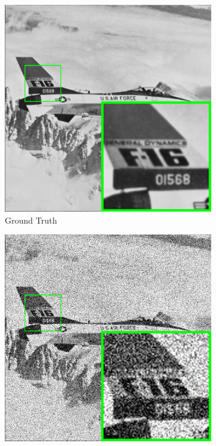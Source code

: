 \begin{figure}
    \centering
    \begin{subfigure}[t]{0.2\textwidth}
        \centering
        \includegraphics[width=1\textwidth]{images/pgpd/br_airplane.png}
	   \caption{Ground Truth}
    \end{subfigure}
    \hfill
    \begin{subfigure}[t]{0.2\textwidth}
        \centering
        \includegraphics[width=1\textwidth]{images/pgpd/br_airplane_50.png}

\end{subfigure}
\end{figure}
